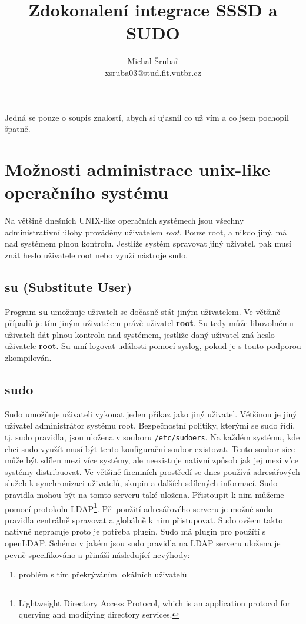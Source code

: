 \documentclass[10pt,a4paper,notitlepage]{article}
\author{Michal Šrubař\\xsruba03@stud.fit.vutbr.cz}
\date{}
\title{Zdokonalení integrace SSSD a SUDO}
\begin{document}
\maketitle

Jedná se pouze o soupis znalostí, abych si ujasnil co už vím a co jsem pochopil
špatně.

\section{Možnosti administrace unix-like operačního systému}
Na většině dnešních UNIX-like operačních systémech jsou všechny administrativní
úlohy prováděny uživatelem \textit{root}. Pouze root, a nikdo jiný, má nad
systémem plnou kontrolu. Jestliže systém spravovat jiný uživatel, pak musí znát
heslo uživatele root nebo využí nástroje sudo.

\subsection{su (Substitute User)}
Program \textbf{su} umožnuje uživateli se dočasně stát jiným uživatelem. Ve
většině případů je tím jiným uživatelem právě uživatel \textbf{root}. Su tedy
může libovolnému uživateli dát plnou kontrolu nad systémem, jestliže daný
uživatel zná heslo uživatele \textbf{root}. Su umí logovat události pomocí
syslog, pokud je s touto podporou zkompilován.

\subsection{sudo}
Sudo umožňuje uživateli vykonat jeden příkaz jako jiný uživatel. Většinou je
jiný uživatel administrátor systému root.  Bezpečnostní politiky, kterými se
sudo řídí, tj. sudo pravidla, jsou uložena v souboru \texttt{/etc/sudoers}. Na
každém systému, kde chci sudo využít musí být tento konfigurační soubor
existovat.  Tento soubor sice může být sdílen mezi více systémy, ale neexistuje
nativní způsob jak jej mezi více systémy distribuovat. Ve většině firemních
prostředí se dnes používá adresářových služeb k synchronizaci uživatelů, skupin
a dalších sdílených informací. Sudo pravidla mohou být na tomto serveru také
uložena.  Přistoupit k nim můžeme pomocí protokolu LDAP\footnote{Lightweight
	Directory Access Protocol, which is an application protocol for querying and
modifying directory services.}. Při použití adresářového serveru je možné sudo
pravidla centrálně spravovat a globálně k nim přistupovat. Sudo ovšem takto
nativně nepracuje proto je potřeba plugin. Sudo má plugin pro použítí s
openLDAP. Schéma v jakém jsou sudo pravidla na LDAP serveru uložena je pevně
specifikováno a přináší následující nevýhody: 
\begin{enumerate} 
	\item problém s	tím překrýváním lokálních uživatelů 
\end{enumerate}
\end{document}
